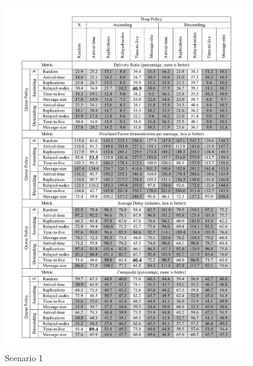\documentclass[conference,10pt,letterpaper,final]{IEEEtran}
\begin{document}
\begin{figure}[h]
	\centering
	\includegraphics[width=0.95\textwidth]{graphics/tables/scenario1}
	\caption{Scenario 1}
	\label{results:scenario1}
\end{figure}
\end{document}
